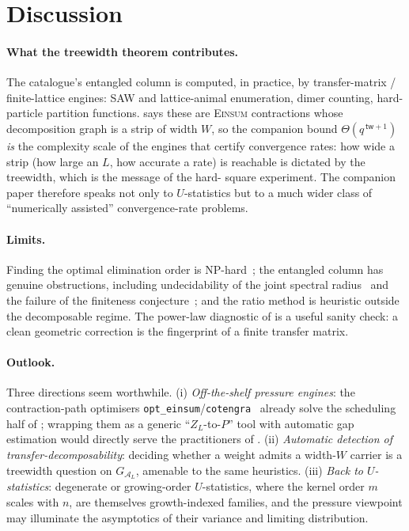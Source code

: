 \documentclass[11pt]{article}
\newcommand{\Einsum}{\textsc{Einsum}}
\newcommand{\calA}{\mathcal{A}}
\newcommand{\graphform}[1]{G_{#1}}
\newcommand{\pressure}{P}
\newcommand{\opteinsum}{\texttt{opt\_einsum}}
\newcommand{\cotengra}{\texttt{cotengra}}
\theoremstyle{plain}
\theoremstyle{definition}
\theoremstyle{remark}
\begin{document}
\section{Discussion}
\label{sec:discussion}

\paragraph{What the treewidth theorem contributes.}
The catalogue's entangled column is computed, in practice, by transfer-matrix /
finite-lattice engines: SAW and lattice-animal enumeration, dimer counting, hard-%
particle partition functions.  says these are \Einsum{}
contractions whose decomposition graph is a strip of width $W$, so the companion
bound $\Theta(q^{\,\textsf{tw}+1})$ \emph{is} the complexity scale of the engines
that certify convergence rates: how wide a strip (how large an $L$, how accurate a
rate) is reachable is dictated by the treewidth, which is the message of the hard-%
square experiment. The companion paper therefore speaks not only to $U$-statistics
but to a much wider class of ``numerically assisted'' convergence-rate problems.

\paragraph{Limits.}
Finding the optimal elimination order is NP-hard~\citep{arnborg1987complexity}; the
entangled column has genuine obstructions, including undecidability of the joint
spectral radius~\citep{blondel2000boundedness} and the failure of the finiteness
conjecture~\citep{bousch2002asymptotic}; and the ratio method is heuristic outside
the decomposable regime. The power-law diagnostic of  is a useful
sanity check: a clean geometric correction is the fingerprint of a finite transfer
matrix.

\paragraph{Outlook.}
Three directions seem worthwhile. (i) \emph{Off-the-shelf pressure engines}: the
contraction-path optimisers \opteinsum{}/\cotengra{}~\citep{smith2018opt,gray2021hyper}
already solve the scheduling half of ; wrapping them as a generic
``$Z_L$-to-$\pressure$'' tool with automatic gap estimation would directly serve the
practitioners of . (ii) \emph{Automatic detection of
transfer-decomposability}: deciding whether a weight admits a width-$W$ carrier is a
treewidth question on $\graphform{\calA_L}$, amenable to the same heuristics.
(iii) \emph{Back to $U$-statistics}: degenerate or growing-order $U$-statistics, where
the kernel order $m$ scales with $n$, are themselves growth-indexed families, and the
pressure viewpoint may illuminate the asymptotics of their variance and limiting
distribution.
\end{document}
